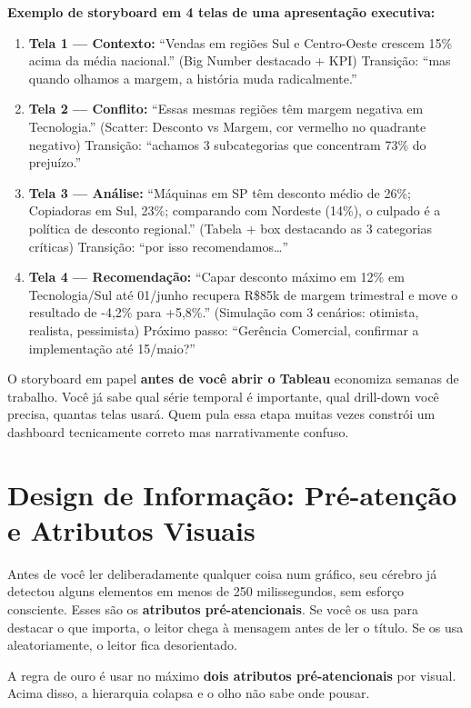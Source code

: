 \textbf{Exemplo de storyboard em 4 telas de uma apresentação executiva:}
\begin{enumerate}
  \item \textbf{Tela 1 --- Contexto:} ``Vendas em regiões Sul e Centro-Oeste crescem 15\% acima da média nacional.'' (Big Number destacado + KPI) Transição: ``mas quando olhamos a margem, a história muda radicalmente.''
  \item \textbf{Tela 2 --- Conflito:} ``Essas mesmas regiões têm margem negativa em Tecnologia.'' (Scatter: Desconto vs Margem, cor vermelho no quadrante negativo) Transição: ``achamos 3 subcategorias que concentram 73\% do prejuízo.''
  \item \textbf{Tela 3 --- Análise:} ``Máquinas em SP têm desconto médio de 26\%; Copiadoras em Sul, 23\%; comparando com Nordeste (14\%), o culpado é a política de desconto regional.'' (Tabela + box destacando as 3 categorias críticas) Transição: ``por isso recomendamos\ldots''
  \item \textbf{Tela 4 --- Recomendação:} ``Capar desconto máximo em 12\% em Tecnologia/Sul até 01/junho recupera R\$85k de margem trimestral e move o resultado de -4,2\% para +5,8\%.'' (Simulação com 3 cenários: otimista, realista, pessimista) Próximo passo: ``Gerência Comercial, confirmar a implementação até 15/maio?''
\end{enumerate}

O storyboard em papel \textbf{antes de você abrir o Tableau} economiza semanas de trabalho. Você já sabe qual série temporal é importante, qual drill-down você precisa, quantas telas usará. Quem pula essa etapa muitas vezes constrói um dashboard tecnicamente correto mas narrativamente confuso.

\section{Design de Informação: Pré-atenção e Atributos Visuais}

Antes de você ler deliberadamente qualquer coisa num gráfico, seu cérebro já detectou alguns elementos em menos de 250 milissegundos, sem esforço consciente. Esses são os \textbf{atributos pré-atencionais}. Se você os usa para destacar o que importa, o leitor chega à mensagem antes de ler o título. Se os usa aleatoriamente, o leitor fica desorientado.

A regra de ouro é usar no máximo \textbf{dois atributos pré-atencionais} por visual. Acima disso, a hierarquia colapsa e o olho não sabe onde pousar.


